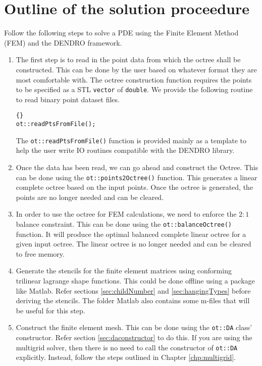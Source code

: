 \documentclass[12pt,reqno,a4paper]{report}
\numberwithin{equation}{section}
\begin{document}
\section{Outline of the solution proceedure}
\label{sec:femOutline}
Follow the following steps to solve a PDE using the Finite Element Method (FEM) and the DENDRO framework. 
\begin{enumerate}
\item The first step is to read in the point data from which the octree shall be constructed. This can be done by the user based on whatever format they are most comfortable with. The octree construction function requires the points to be specified as a STL {\tt vector} of {\tt double}. We provide the following routine to read binary point dataset files. 

\begin{lstlisting}[frame=trbl, fontadjust]{}
ot::readPtsFromFile();
\end{lstlisting}

The \lstinline[basicstyle=\bfseries]!ot::readPtsFromFile()! function is provided mainly as a template to help the user write IO routines compatible with the DENDRO library.

\item Once the data has been read, we can go ahead and construct the Octree. This can be done using
 the \lstinline[basicstyle=\bfseries]!ot::points2Octree()! function. This generates a linear complete octree based on the input points. Once the octree is generated, the points are no longer needed and can be cleared.

\item In order to use the octree for FEM calculations, we need to enforce the $2:1$ balance constraint. This can be done using the \lstinline[basicstyle=\bfseries]!ot::balanceOctree()! function. It will produce the optimal balanced complete linear octree for a given input octree. The linear octree is no longer needed and can be cleared to free memory.

\item Generate the stencils for the finite element matrices using conforming trilinear lagrange shape functions. This could be done offline using a package like Matlab. Refer sections \ref{sec:childNumber} and \ref{sec:hangingTypes} before deriving the stencils. The folder Matlab also contains some m-files that will be useful for this step.

\item Construct the finite element mesh. This can be done using the {\tt ot::DA} class' constructor. Refer section \ref{sec:daconstructor} to do this. If you are using the multigrid solver, then there is no need to call the constructor of {\tt ot::DA} explicitly. Instead, follow the steps outlined in Chapter \ref{chp:multigrid}. 


\end{enumerate}
\end{document}
